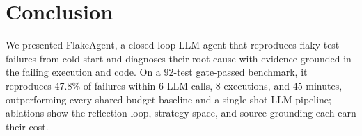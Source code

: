 \section{Conclusion}

We presented FlakeAgent, a closed-loop LLM agent that reproduces flaky test
failures from cold start and diagnoses their root cause with evidence grounded
in the failing execution and code. On a 92-test gate-passed benchmark, it
reproduces 47.8\% of failures within 6 LLM calls, 8 executions, and 45
minutes, outperforming every shared-budget baseline and a single-shot LLM
pipeline; ablations show the reflection loop, strategy space, and source
grounding each earn their cost.
